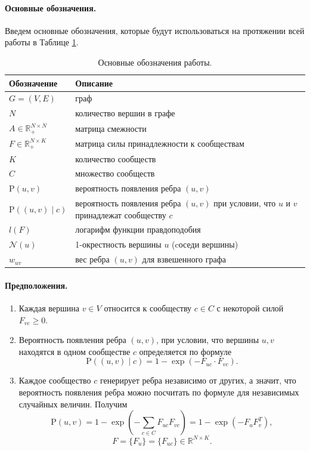 \documentclass{ITaSconf}
\def\PP{\mathrm{P}}
\begin{document}
\paragraph{Основные обозначения.} Введем основные обозначения, которые будут использоваться на протяжении всей работы в Таблице \ref{table:notation}.
\begin{table}[!t]
	\centering
	\begin{tabular}{ p{6em}   p{14em} }
		\hline
		\hline
		Обозначение 						& Описание \\
		\hline
		$G = (V,E) $ 						& граф \\             
		$N$    								& количество вершин в графе \\        
		$A \in \mathbb{R}_{+}^{N\times N}$  & матрица смежности   \\
		$F \in \mathbb{R}_{+}^{N\times K}$  & матрица силы принадлежности к сообществам			\\
		$K$    								& количество сообществ \\
		$C$    								& множество сообществ  \\
		$\PP(u,v)$							& вероятность появления ребра $(u,v)$ \\
		$\PP((u,v) \mid c)$ 					& вероятность появления ребра $(u,v)$ при условии, что $u$ и $v$ принадлежат сообществу $c$ \\
		
		$l(F)$								& логарифм функции правдоподобия \\
		$\mathcal{N}(u)$ 					& 1-окрестность вершины $u$ (cоседи вершины) \\
		$w_{uv}$							& вес ребра $(u,v)$ для взвешенного графа \\
		\hline
		\hline
	\end{tabular}
	\caption{Основные обозначения работы.}
	\label{table:notation}
\end{table}
\paragraph{Предположения.} 
\begin{enumerate}
	\item Каждая вершина $v\in V$ относится к сообществу $c \in C$ с некоторой силой
	$F_{vc} \ge 0.$
	\item Вероятность появления ребра $(u,v)$, при условии, что вершины $u,v$ находятся в одном сообществе $c$ определяется по формуле 
	$$\PP((u,v) \mid c)=1 - \exp(-F_{uc}\cdot F_{vc}).$$
	\item Каждое сообщество $c$ генерирует ребра независимо от других, а значит, что вероятность появления ребра можно посчитать по формуле для независимых случайных величин. Получим
	$$\PP(u,v)=1 - \exp(-\sum_{c\in C} F_{uc} F_{vc}) = 1 - \exp( - F_{u} F_{v}^T),$$
	$$F = \{F_u\} = \{F_{uc}\} \in \mathbb {R}^{N \times K}. $$
\end{enumerate}
\end{document}
